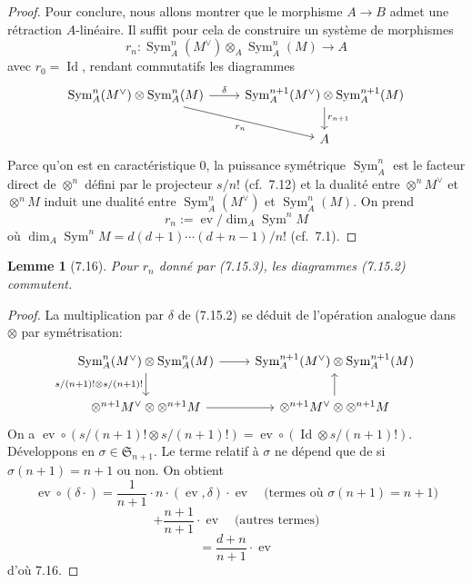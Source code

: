 \documentclass[12pt,a4paper]{article}
\theoremstyle{plain}
\newtheorem{lemma}[theorem]{Lemme}
\theoremstyle{definition}
\DeclareMathOperator{\Id}{Id}
\DeclareMathOperator{\ev}{ev}
\DeclareMathOperator{\Sym}{Sym}
\begin{document}
\begin{proof}
Pour conclure, nous allons montrer que le morphisme $A \to B$ admet une rétraction $A$-linéaire. Il suffit pour cela de construire un système de morphismes
\[
r_n : \Sym^n_A(M^\vee) \otimes_A \Sym^n_A(M) \to A
\]
avec $r_0 = \Id$, rendant commutatifs les diagrammes
\begin{equation}\label{eq:7.15.2}
\begin{tikzcd}
\Sym^n_A(M^\vee) \otimes \Sym^n_A(M) \arrow[r, "\delta"] \arrow[dr, "r_n"'] & \Sym^{n+1}_A(M^\vee) \otimes \Sym^{n+1}_A(M) \arrow[d, "r_{n+1}"] \\
& A
\end{tikzcd}
\end{equation}
Parce qu'on est en caractéristique 0, la puissance symétrique $\Sym^n_A$ est le facteur direct de $\otimes^n$ défini par le projecteur $s/n!$ (cf.~7.12) et la dualité entre $\otimes^n M^\vee$ et $\otimes^n M$ induit une dualité entre $\Sym^n_A(M^\vee)$ et $\Sym^n_A(M)$. On prend
\begin{equation}\label{eq:7.15.3}
r_n := \ev / \dim_A \Sym^n M
\end{equation}
où $\dim_A \Sym^n M = d(d+1) \cdots (d+n-1)/n!$ (cf.~7.1).
\end{proof}

\begin{lemma}[7.16]
Pour $r_n$ donné par (7.15.3), les diagrammes (7.15.2) commutent.
\end{lemma}

\begin{proof}
La multiplication par $\delta$ de (7.15.2) se déduit de l'opération analogue dans $\otimes$ par symétrisation:
\[
\begin{tikzcd}
\Sym^n_A(M^\vee) \otimes \Sym^n_A(M) \arrow[r] \arrow[d, "s/(n+1)! \otimes s/(n+1)!"'] & \Sym^{n+1}_A(M^\vee) \otimes \Sym^{n+1}_A(M) \\
\otimes^{n+1} M^\vee \otimes \otimes^{n+1} M \arrow[r] & \otimes^{n+1} M^\vee \otimes \otimes^{n+1} M \arrow[u]
\end{tikzcd}
\]
On a $\ev \circ (s/(n+1)! \otimes s/(n+1)!) = \ev \circ (\Id \otimes s/(n+1)!)$. Développons en $\sigma \in \mathfrak{S}_{n+1}$. Le terme relatif à $\sigma$ ne dépend que de si $\sigma(n+1) = n+1$ ou non. On obtient
\[
\ev \circ (\delta \cdot) = \frac{1}{n+1} \cdot n \cdot (\ev, \delta) \cdot \ev \quad \text{(termes où $\sigma(n+1) = n+1$)}
\]
\[
+ \frac{n+1}{n+1} \cdot \ev \quad \text{(autres termes)}
\]
\[
= \frac{d+n}{n+1} \cdot \ev
\]
d'où 7.16.
\end{proof}
\end{document}
